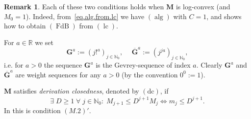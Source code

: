 \documentclass[11pt,a4paper]{article}
\makeatletter
\theoremstyle{plain}
\theoremstyle{definition}
\newtheorem{remark}[proposition]{Remark}
\DeclareRobustCommand\widecheck[1]{{\mathpalette\@widecheck{#1}}}
\def\@widecheck#1#2{%
	\setbox\z@\hbox{\m@th$#1#2$}%
	\setbox\tw@\hbox{\m@th$#1%
		\widehat{%
			\vrule\@width\z@\@height\ht\z@
			\vrule\@height\z@\@width\wd\z@}$}%
	\dp\tw@-\ht\z@
	\@tempdima\ht\z@ \advance\@tempdima2\ht\tw@ \divide\@tempdima\thr@@
	\setbox\tw@\hbox{%
		 \raise\@tempdima\hbox{\scalebox{1}[-1]{\lower\@tempdima\box
				\tw@}}}%
	{\ooalign{\box\tw@ \cr \box\z@}}}
\renewcommand{\check}[1]{\widecheck{#1}}
\renewcommand{\widecheck}[1]{\widecheck{#1}}
\newcommand{\RR}{\mathbb{R}}
\newcommand{\NN}{\mathbb{N}}
\newcommand{\M}{\mathbf{M}}
\newcommand{\G}{\mathbf{G}}
\let\on=\operatorname
\DeclareRobustCommand\widecheck[1]{{\mathpalette\@widecheck{#1}}}
\def\@widecheck#1#2{%
    \setbox\z@\hbox{\m@th$#1#2$}%
    \setbox\tw@\hbox{\m@th$#1%
       \widehat{%
          \vrule\@width\z@\@height\ht\z@
          \vrule\@height\z@\@width\wd\z@}$}%
    \dp\tw@-\ht\z@
    \@tempdima\ht\z@ \advance\@tempdima2\ht\tw@ \divide\@tempdima\thr@@
    \setbox\tw@\hbox{%
       \raise\@tempdima\hbox{\scalebox{1}[-1]{\lower\@tempdima\box
\tw@}}}%
    {\ooalign{\box\tw@ \cr \box\z@}}}
\makeatother
\begin{document}
\begin{remark}\label{newcondrem}
Each of these two conditions holds when $\mathbf{M}$ is log-convex (and $M_0=1$). Indeed, from~\eqref{eq.alg.from.lc} we have \hyperlink{s-alg}{$(\on{alg})$} with $C=1$, and \cite[Lemma 2.2 (1)]{compositionpaper} shows how to obtain \hyperlink{s-FdB}{$(\on{FdB})$} from \hyperlink{lc}{$(\on{lc})$}.
\end{remark}

For $a\in\RR$ we set
$$\G^a:=(j!^a)_{j\in\NN_0},\hspace{15pt}\overline{\G}^a:=(j^{ja})_{j\in\NN_0},$$
i.e. for $a>0$ the sequence $\G^a$ is the Gevrey-sequence of index $a$. Clearly $ \G^a$ and $\overline{\G}^a $ are weight sequences for any $a>0$ (by the convention $0^0:=1$).





$\M$ satisfies {\itshape derivation closedness}, denoted by \hypertarget{dc}{$(\text{dc})$}, if
$$\exists\;D\ge 1\;\forall\;j\in\NN_0:\;M_{j+1}\le D^{j+1} M_j\Longleftrightarrow m_{j}\le D^{j+1}.$$
In \cite{Komatsu73} this is condition $(M.2)'$. 
\end{document}
